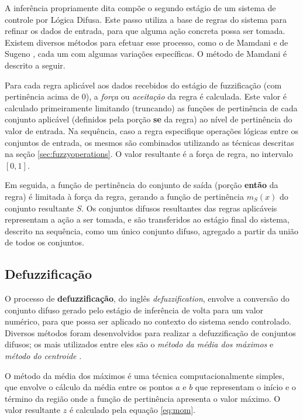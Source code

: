 \documentclass[12pt]{article}
\begin{document}
A inferência propriamente dita compõe o segundo estágio de um sistema de controle por Lógica Difusa. Este passo utiliza a base de regras do sistema para refinar os dados de entrada, para que alguma ação concreta possa ser tomada. Existem diversos métodos para efetuar esse processo, como o de Mamdani \cite{Mamdani1975} e de Sugeno \cite{Sugeno1988}, cada um com algumas variações específicas. O método de Mamdani é descrito a seguir.

Para cada regra aplicável aos dados recebidos do estágio de fuzzificação (com pertinência acima de 0), a \textit{força} ou \textit{aceitação} da regra é calculada. Este valor é calculado primeiramente limitando (truncando) as funções de pertinência de cada conjunto aplicável (definidos pela porção \textbf{se} da regra) ao nível de pertinência do valor de entrada. Na sequência, caso a regra especifique operações lógicas entre os conjuntos de entrada, os mesmos são combinados utilizando as técnicas descritas na seção \ref{sec:fuzzyoperations}. O valor resultante é a força de regra, no intervalo $[0, 1]$.


Em seguida, a função de pertinência do conjunto de saída (porção \textbf{então} da regra) é limitada à força da regra, gerando a função de pertinência $m_{S}(x)$ do conjunto resultante $S$. Os conjuntos difusos resultantes das regras aplicáveis representam a ação a ser tomada, e são transferidos ao estágio final do sistema, descrito na sequência, como um único conjunto difuso, agregado a partir da união de todos os conjuntos.

\subsection{Defuzzificação} \label{sec:defuzzification}

O processo de \textbf{defuzzificação}, do inglês \textit{defuzzification}, envolve a conversão do conjunto difuso gerado pelo estágio de inferência de volta para um valor numérico, para que possa ser aplicado no contexto do sistema sendo controlado. Diversos métodos foram desenvolvidos para realizar a defuzzificação de conjuntos difusos; os mais utilizados entre eles são o \textit{método da média dos máximos} e \textit{método do centroide} \cite{Ross2010}.

O método da média dos máximos é uma técnica computacionalmente simples, que envolve o cálculo da média entre os pontos $a$ e $b$ que representam o início e o término da região onde a função de pertinência apresenta o valor máximo. O valor resultante $z$ é calculado pela equação \ref{eq:mom}.
\end{document}
